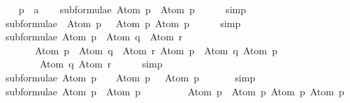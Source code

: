 \begin{isabellebody}
\begin{isamarkuptext}
\end{isamarkuptext}\isamarkuptrue%
\isamarkupfalse%
\isanewline
{}\isanewline
%
\isadelimproof
\ \ %
\endisadelimproof
%
\isatagproof
{}\isamarkupfalse%
\ p\ {\isacharcolon}{\isacharcolon}\ {\isacharprime}a\isanewline
\isanewline
\ \ \isamarkupfalse%
\ {\isachardoublequoteopen}subformulae\ {\isacharparenleft}Atom\ p{\isacharparenright}\ {\isacharequal}\ {\isacharbrackleft}Atom\ p{\isacharbrackright}{\isachardoublequoteclose}\isanewline
\ \ \ \ \isamarkupfalse%
\ simp\isanewline
\isanewline
\ \ \isamarkupfalse%
\ {\isachardoublequoteopen}subformulae\ {\isacharparenleft}\isactrlbold {\isasymnot}\ {\isacharparenleft}Atom\ p{\isacharparenright}{\isacharparenright}\ {\isacharequal}\ {\isacharbrackleft}\isactrlbold {\isasymnot}\ {\isacharparenleft}Atom\ p{\isacharparenright}{\isacharcomma}\ Atom\ p{\isacharbrackright}{\isachardoublequoteclose}\isanewline
\ \ \ \ \isamarkupfalse%
\ simp\isanewline
\isanewline
\ \ \isamarkupfalse%
\ {\isachardoublequoteopen}subformulae\ {\isacharparenleft}{\isacharparenleft}Atom\ p\ \isactrlbold {\isasymrightarrow}\ Atom\ q{\isacharparenright}\ \isactrlbold {\isasymor}\ Atom\ r{\isacharparenright}\ {\isacharequal}\ \isanewline
\ \ \ \ \ \ \ {\isacharbrackleft}{\isacharparenleft}Atom\ p\ \isactrlbold {\isasymrightarrow}\ Atom\ q{\isacharparenright}\ \isactrlbold {\isasymor}\ Atom\ r{\isacharcomma}\ Atom\ p\ \isactrlbold {\isasymrightarrow}\ Atom\ q{\isacharcomma}\ Atom\ p{\isacharcomma}\ \isanewline
\ \ \ \ \ \ \ \ Atom\ q{\isacharcomma}\ Atom\ r{\isacharbrackright}{\isachardoublequoteclose}\isanewline
\ \ \ \ \isamarkupfalse%
\ simp\isanewline
\isanewline
\ \ \isamarkupfalse%
\ {\isachardoublequoteopen}subformulae\ {\isacharparenleft}Atom\ p\ \isactrlbold {\isasymand}\ {\isasymbottom}{\isacharparenright}\ {\isacharequal}\ {\isacharbrackleft}Atom\ p\ \isactrlbold {\isasymand}\ {\isasymbottom}{\isacharcomma}\ Atom\ p{\isacharcomma}\ {\isasymbottom}{\isacharbrackright}{\isachardoublequoteclose}\isanewline
\ \ \ \ \isamarkupfalse%
\ simp\isanewline
\isanewline
\ \ \isamarkupfalse%
\ {\isachardoublequoteopen}subformulae\ {\isacharparenleft}Atom\ p\ \isactrlbold {\isasymor}\ Atom\ p{\isacharparenright}\ {\isacharequal}\ \isanewline
\ \ \ \ \ \ \ {\isacharbrackleft}Atom\ p\ \isactrlbold {\isasymor}\ Atom\ p{\isacharcomma}\ Atom\ p{\isacharcomma}\ Atom\ p{\isacharbrackright}{\isachardoublequoteclose}\isanewline

\end{isabellebody}
